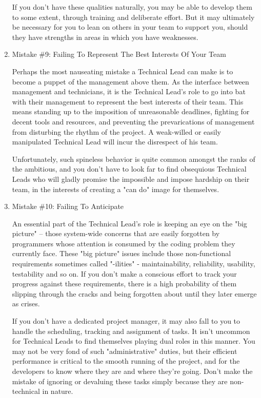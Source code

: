 \documentclass{article}
\begin{document}
\begin{enumerate}
If you don't have these qualities naturally, you may be able to develop
them to some extent, through training and deliberate effort. But it may
ultimately be necessary for you to lean on others in your team to
support you, should they have strengths in areas in which you have
weaknesses.

\item Mistake \#9: Failing To Represent The Best Interests Of Your Team
\label{sec:orgheadline152}

Perhaps the most nauseating mistake a Technical Lead can make is to
become a puppet of the management above them. As the interface between
management and technicians, it is the Technical Lead's role to go into
bat with their management to represent the best interests of their team.
This means standing up to the imposition of unreasonable deadlines,
fighting for decent tools and resources, and preventing the
prevarications of management from disturbing the rhythm of the project.
A weak-willed or easily manipulated Technical Lead will incur the
disrespect of his team.

Unfortunately, such spineless behavior is quite common amongst the ranks
of the ambitious, and you don't have to look far to find obsequious
Technical Leads who will gladly promise the impossible and impose
hardship on their team, in the interests of creating a "can do" image
for themselves.

\item Mistake \#10: Failing To Anticipate
\label{sec:orgheadline153}

An essential part of the Technical Lead's role is keeping an eye on the
"big picture" -- those system-wide concerns that are easily forgotten by
programmers whose attention is consumed by the coding problem they
currently face. These "big picture" issues include those non-functional
requirements sometimes called "-ilities" - maintainability, reliability,
usability, testability and so on. If you don't make a conscious effort
to track your progress against these requirements, there is a high
probability of them slipping through the cracks and being forgotten
about until they later emerge as crises.

If you don't have a dedicated project manager, it may also fall to you
to handle the scheduling, tracking and assignment of tasks. It isn't
uncommon for Technical Leads to find themselves playing dual roles in
this manner. You may not be very fond of such "administrative" duties,
but their efficient performance is critical to the smooth running of the
project, and for the developers to know where they are and where they're
going. Don't make the mistake of ignoring or devaluing these tasks
simply because they are non-technical in nature.


\end{enumerate}
\end{document}
